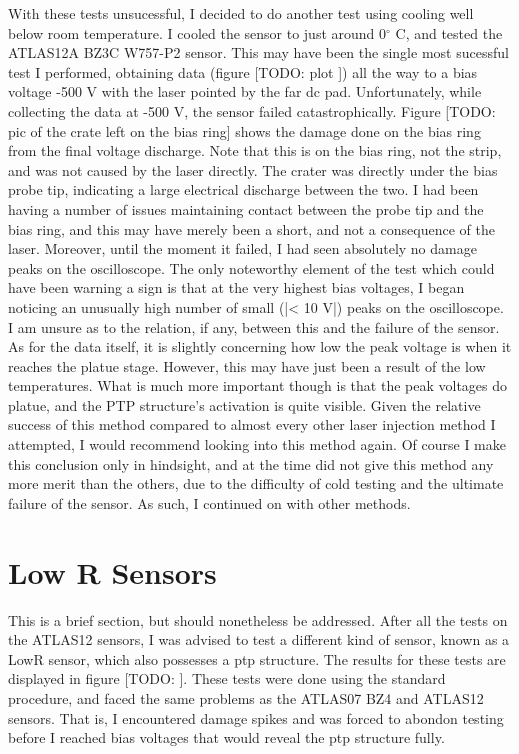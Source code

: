\documentclass{report}
\begin{document}
            With these tests unsucessful, I decided to do another test using cooling well below room temperature. I cooled the sensor to just around 0$^\circ$ C, and tested the ATLAS12A BZ3C W757-P2 sensor. This may have been the single most sucessful test I performed, obtaining data (figure [TODO: plot
            ]) all the way to a bias voltage -500 V with the laser pointed by the far dc pad. Unfortunately, while collecting the data at -500 V, the sensor failed catastrophically. Figure [TODO: pic of the crate left on the bias ring] shows the damage done on the bias ring from the final voltage discharge. Note that this is on the bias ring, not the strip, and was not caused by the laser directly. The crater was directly under the bias probe tip, indicating a large electrical discharge between the two. I had been having a number of issues maintaining contact between the probe tip and the bias ring, and this may have merely been a short, and not a consequence of the laser. Moreover, until the moment it failed, I had seen absolutely no damage peaks on the oscilloscope. The only noteworthy element of the test which could have been warning a sign is that at the very highest bias voltages, I began noticing an unusually high number of small (|< 10 V|) peaks on the oscilloscope. I am unsure as to the relation, if any, between this and the failure of the sensor. As for the data itself, it is slightly concerning how low the peak voltage is when it reaches the platue stage. However, this may have just been a result of the low temperatures. What is much more important though is that the peak voltages do platue, and the PTP structure's activation is quite visible. Given the relative success of this method compared to almost every other laser injection method I attempted, I would recommend looking into this method again. Of course I make this conclusion only in hindsight, and at the time did not give this method any more merit than the others, due to the difficulty of cold testing and the ultimate failure of the sensor. As such, I continued on with other methods.


            
        \section{Low R Sensors}
            This is a brief section, but should nonetheless be addressed. After all the tests on the ATLAS12 sensors, I was advised to test a different kind of sensor, known as a LowR sensor, which also possesses a ptp structure. The results for these tests are displayed in figure [TODO:
            ]. These tests were done using the standard procedure, and faced the same problems as the ATLAS07 BZ4 and ATLAS12 sensors. That is, I encountered damage spikes and was forced to abondon testing before I reached bias voltages that would reveal the ptp structure fully.
\end{document}
